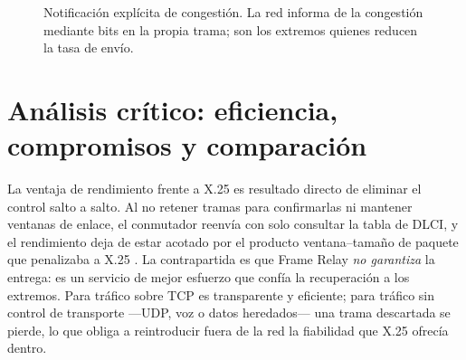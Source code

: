 \documentclass[12pt,a4paper]{article}
\begin{document}
\begin{figure}[h]
    \centering
    \caption{Notificación explícita de congestión. La red informa de la congestión mediante bits en la propia trama; son los extremos quienes reducen la tasa de envío.}
    \label{fig:congestion}
\end{figure}

\section{Análisis crítico: eficiencia, compromisos y comparación}

La ventaja de rendimiento frente a X.25 es resultado directo de eliminar el control salto a salto. Al no retener tramas para confirmarlas ni mantener ventanas de enlace, el conmutador reenvía con solo consultar la tabla de DLCI, y el rendimiento deja de estar acotado por el producto ventana--tamaño de paquete que penalizaba a X.25 \cite{tanenbaum2012}. La contrapartida es que Frame Relay \emph{no garantiza} la entrega: es un servicio de mejor esfuerzo que confía la recuperación a los extremos. Para tráfico sobre TCP es transparente y eficiente; para tráfico sin control de transporte ---UDP, voz o datos heredados--- una trama descartada se pierde, lo que obliga a reintroducir fuera de la red la fiabilidad que X.25 ofrecía dentro.
\end{document}
